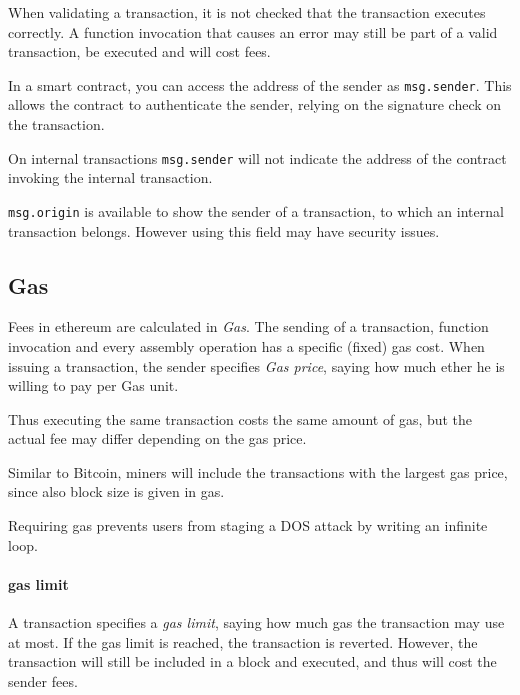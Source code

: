 \begin{note}
When validating a transaction, it is not checked that the transaction executes correctly. A function invocation that causes an error may still be part of a valid transaction, be executed and will cost fees.
\end{note}

In a smart contract, you can access the address of the sender as \texttt{msg.sender}. This allows the contract to authenticate the sender, relying on the signature check on the transaction.

\begin{note}
On internal transactions \texttt{msg.sender} will not indicate the address of the contract invoking the internal transaction.

\texttt{msg.origin} is available to show the sender of a transaction, to which an internal transaction belongs. However using this field may have security issues.
\end{note}

\subsection{Gas}
Fees in ethereum are calculated in \emph{Gas}.
The sending of a transaction, function invocation and every assembly operation has a specific (fixed) gas cost. 
When issuing a transaction, the sender specifies \emph{Gas price}, saying how much ether he is willing to pay per Gas unit.

Thus executing the same transaction costs the same amount of gas, but the actual fee may differ depending on the gas price.

Similar to Bitcoin, miners will include the transactions with the largest gas price, since also block size is given in gas.

\begin{note}
Requiring gas prevents users from staging a DOS attack by writing an infinite loop.
\end{note}

\paragraph{gas limit}
A transaction specifies a \emph{gas limit}, saying how much gas the transaction may use at most. If the gas limit is reached, the transaction is reverted.
However, the transaction will still be included in a block and executed, and thus will cost the sender fees.

